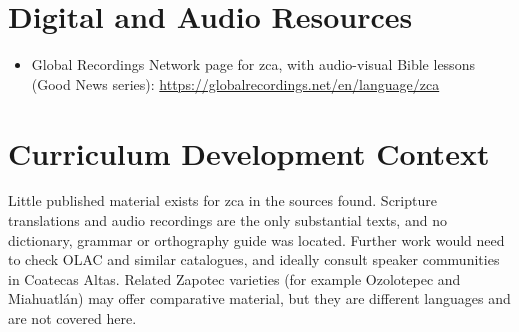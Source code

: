 \documentclass[12pt]{article}
\begin{document}
\section{Digital and Audio Resources}
\begin{itemize}
\item Global Recordings Network page for zca, with audio-visual Bible lessons (Good News series): \url{https://globalrecordings.net/en/language/zca}
\end{itemize}

\section{Curriculum Development Context}
Little published material exists for zca in the sources found. Scripture translations and audio recordings are the only substantial texts, and no dictionary, grammar or orthography guide was located. Further work would need to check OLAC and similar catalogues, and ideally consult speaker communities in Coatecas Altas. Related Zapotec varieties (for example Ozolotepec and Miahuatl\'an) may offer comparative material, but they are different languages and are not covered here.
\end{document}
